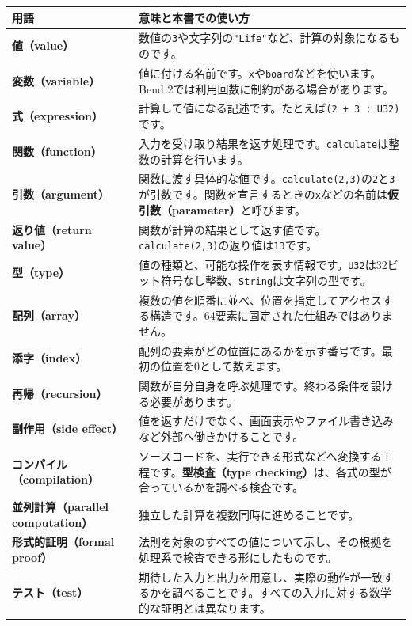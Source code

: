 \documentclass[11pt,a4paper,openany]{book}
\newcommand{\code}[1]{\texttt{#1}}
\newcommand{\term}[1]{\textbf{#1}}
\begin{document}
\begin{longtable}{@{}L{47mm}p{103mm}@{}}
\toprule 用語 & 意味と本書での使い方\\\midrule\endhead
\term{値（value）} & 数値の\code{3}や文字列の\code{"Life"}など、計算の対象になるものです。\\
\term{変数（variable）} & 値に付ける名前です。\code{x}や\code{board}などを使います。Bend 2では利用回数に制約がある場合があります。\\
\term{式（expression）} & 計算して値になる記述です。たとえば\code{(2 + 3 : U32)}です。\\
\term{関数（function）} & 入力を受け取り結果を返す処理です。\code{calculate}は整数の計算を行います。\\
\term{引数（argument）} & 関数に渡す具体的な値です。\code{calculate(2,3)}の\code{2}と\code{3}が引数です。関数を宣言するときの\code{x}などの名前は\term{仮引数（parameter）}と呼びます。\\
\term{返り値（return value）} & 関数が計算の結果として返す値です。\code{calculate(2,3)}の返り値は\code{13}です。\\
\term{型（type）} & 値の種類と、可能な操作を表す情報です。\code{U32}は32ビット符号なし整数、\code{String}は文字列の型です。\\
\term{配列（array）} & 複数の値を順番に並べ、位置を指定してアクセスする構造です。64要素に固定された仕組みではありません。\\
\term{添字（index）} & 配列の要素がどの位置にあるかを示す番号です。最初の位置を0として数えます。\\
\term{再帰（recursion）} & 関数が自分自身を呼ぶ処理です。終わる条件を設ける必要があります。\\
\term{副作用（side effect）} & 値を返すだけでなく、画面表示やファイル書き込みなど外部へ働きかけることです。\\
\term{コンパイル（compilation）} & ソースコードを、実行できる形式などへ変換する工程です。\term{型検査（type checking）}は、各式の型が合っているかを調べる検査です。\\
\term{並列計算（parallel computation）} & 独立した計算を複数同時に進めることです。\\
\term{形式的証明（formal proof）} & 法則を対象のすべての値について示し、その根拠を処理系で検査できる形にしたものです。\\
\term{テスト（test）} & 期待した入力と出力を用意し、実際の動作が一致するかを調べることです。すべての入力に対する数学的な証明とは異なります。\\
\bottomrule
\end{longtable}
\end{document}
